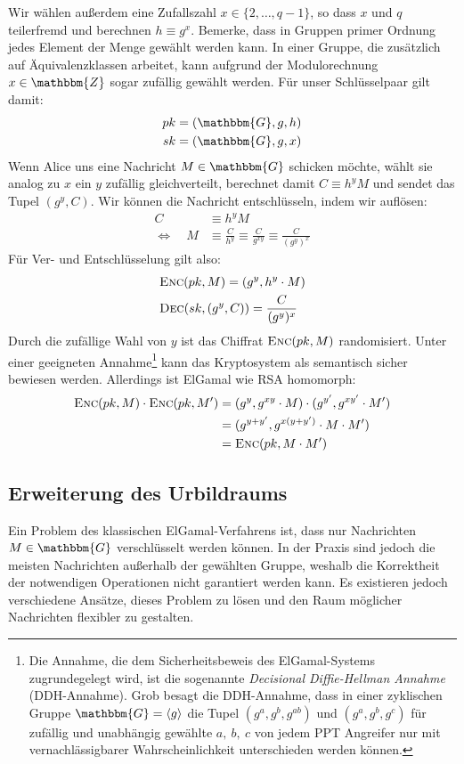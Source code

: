 Wir wählen außerdem eine Zufallszahl $x \in \{2, \dots, q - 1\}$, so dass $x$ und $q$ teilerfremd und berechnen $h \equiv g^x$. Bemerke, dass in Gruppen primer Ordnung jedes Element der Menge gewählt werden kann. In einer Gruppe, die zusätzlich auf Äquivalenzklassen arbeitet, kann aufgrund der Modulorechnung $x \in \mathbbm{Z}$ sogar zufällig gewählt werden. Für unser Schlüsselpaar gilt damit: 
\begin{align*}
	pk &= (\mathbbm{G}, g, h)\\
	sk &=  (\mathbbm{G}, g, x)
\end{align*}
Wenn Alice uns eine Nachricht $M \in \mathbbm{G}$ schicken möchte, wählt sie analog zu $x$ ein $y$ zufällig gleichverteilt, berechnet damit $C \equiv h^y M$ und sendet das Tupel $(g^y ,C)$. Wir können die Nachricht entschlüsseln, indem wir auflösen:
\begin{align*}
	C &\equiv h^y M \\
	\Leftrightarrow \quad M& \equiv \frac{C}{h^y}
	\equiv \frac{C}{g^{xy}}
	\equiv \frac{C}{(g^y)^x}
\end{align*}
Für Ver- und Entschlüsselung gilt also:
\begin{align*}
	&\textsc{Enc}(pk, M) = (g^y, h^y \cdot M) \\
	&\textsc{Dec}(sk, (g^y, C)) = \frac{C}{(g^y)^x}
\end{align*}
Durch die zufällige Wahl von $y$ ist das Chiffrat $\textsc{Enc}({pk, M})$ randomisiert. Unter einer geeigneten Annahme\footnote{Die Annahme, die dem Sicherheitsbeweis
des ElGamal-Systems zugrundegelegt wird, ist die sogenannte \emph{Decisional Diffie-Hellman Annahme} (DDH-Annahme). Grob besagt die DDH-Annahme, 
dass in einer zyklischen Gruppe $\mathbbm{G} = \langle g \rangle$ die Tupel $(g^a, g^b, g^{ab})$ und $(g^a, g^b, g^c)$ für zufällig und unabhängig gewählte $a,~b,~c$
von jedem PPT Angreifer nur mit vernachlässigbarer Wahrscheinlichkeit unterschieden werden können.} kann das Kryptosystem als semantisch sicher bewiesen
werden. Allerdings ist ElGamal wie RSA homomorph:
\begin{align*}
	\textsc{Enc}({pk,M}) \cdot \textsc{Enc}({pk,M'})
	&= (g^y, g^{xy} \cdot M) \cdot (g^{y'}, g^{xy'} \cdot M')\\
	&= (g^{y+y'}, g^{x(y + y')} \cdot M \cdot M')\\
	&= \textsc{Enc}({pk, M \cdot M'})
\end{align*}

\subsection{Erweiterung des Urbildraums}
Ein Problem des klassischen ElGamal-Verfahrens ist, dass nur Nachrichten $M \in \mathbbm{G}$ verschlüsselt werden können. In der Praxis sind jedoch die meisten Nachrichten außerhalb der gewählten Gruppe, weshalb die Korrektheit der notwendigen Operationen nicht garantiert werden kann. Es existieren jedoch verschiedene Ansätze, dieses Problem zu lösen und den Raum möglicher Nachrichten flexibler zu gestalten.

